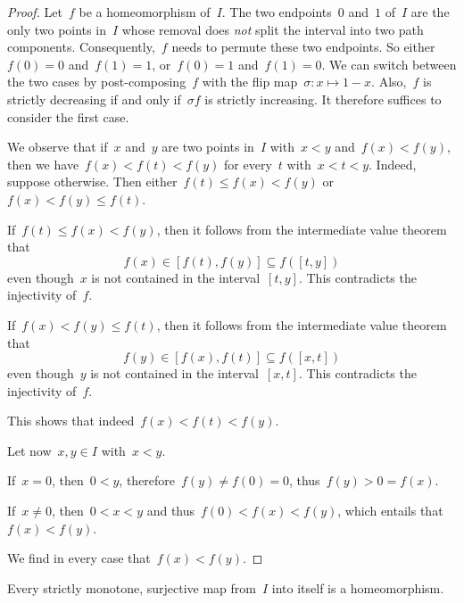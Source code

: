 \begin{proof}
	Let~$f$ be a homeomorphism of~$I$.
	The two endpoints~$0$ and~$1$ of~$I$ are the only two points in~$I$ whose removal does \emph{not} split the interval into two path components.
	Consequently,~$f$ needs to permute these two endpoints.
	So either~$f(0) = 0$ and~$f(1) = 1$, or~$f(0) = 1$ and~$f(1) = 0$.
	We can switch between the two cases by post-composing~$f$ with the flip map~$σ \colon x \mapsto 1 - x$.
	Also,~$f$ is strictly decreasing if and only if~$σ f$ is strictly increasing.
	It therefore suffices to consider the first case.

	We observe that if~$x$ and~$y$ are two points in~$I$ with~$x < y$ and~$f(x) < f(y)$, then we have~$f(x) < f(t) < f(y)$ for every~$t$ with~$x < t < y$.
	Indeed, suppose otherwise.
	Then either~$f(t) ≤ f(x) < f(y)$ or~$f(x) < f(y) ≤ f(t)$.
	\begin{itemize*}

		\item
			If~$f(t) ≤ f(x) < f(y)$, then it follows from the intermediate value theorem that
			\[
				f(x) ∈ [f(t), f(y)] ⊆ f([t, y])
			\]
			even though~$x$ is not contained in the interval~$[t, y]$.
			This contradicts the injectivity of~$f$.

		\item
			If~$f(x) < f(y) ≤ f(t)$, then it follows from the intermediate value theorem that
			\[
				f(y) ∈ [f(x), f(t)] ⊆ f([x, t])
			\]
			even though~$y$ is not contained in the interval~$[x, t]$.
			This contradicts the injectivity of~$f$.

	\end{itemize*}
	This shows that indeed~$f(x) < f(t) < f(y)$.

	Let now~$x, y ∈ I$ with~$x < y$.
	\begin{itemize*}
	
		\item
			If~$x = 0$, then~$0 < y$, therefore~$f(y) ≠ f(0) = 0$, thus~$f(y) > 0 = f(x)$.

		\item
			If~$x ≠ 0$, then~$0 < x < y$ and thus~$f(0) < f(x) < f(y)$, which entails that~$f(x) < f(y)$.

	\end{itemize*}
	We find in every case that~$f(x) < f(y)$.
\end{proof}

\begin{lemma}
	Every strictly monotone, surjective map from~$I$ into itself is a homeomorphism.
\end{lemma}

